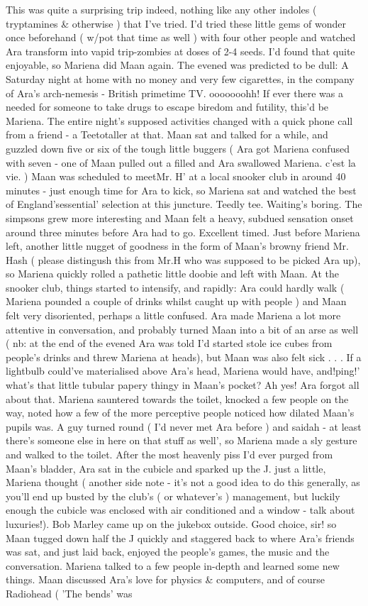 \documentclass[12pt]{book}
\begin{document}
This was quite a surprising trip indeed, nothing like any other indoles ( tryptamines \& otherwise ) that I've tried. I'd tried these little gems of wonder once beforehand ( w/pot that time as well ) with four other people and watched Ara transform into vapid trip-zombies at doses of 2-4 seeds. I'd found that quite enjoyable, so Mariena did Maan again. The evened was predicted to be dull: A Saturday night at home with no money and very few cigarettes, in the company of Ara's arch-nemesis - British primetime TV. ooooooohh! If ever there was a needed for someone to take drugs to escape biredom and futility, this'd be Mariena. The entire night's supposed activities changed with a quick phone call from a friend - a Teetotaller at that. Maan sat and talked for a while, and guzzled down five or six of the tough little buggers ( Ara got Mariena confused with seven - one of Maan pulled out a filled and Ara swallowed Mariena. c'est la vie. ) Maan was scheduled to meetMr. H' at a local snooker club in around 40 minutes - just enough time for Ara to kick, so Mariena sat and watched the best of England'sessential' selection at this juncture. Teedly tee. Waiting's boring. The simpsons grew more interesting and Maan felt a heavy, subdued sensation onset around three minutes before Ara had to go. Excellent timed. Just before Mariena left, another little nugget of goodness in the form of Maan's browny friend Mr. Hash ( please distingush this from Mr.H who was supposed to be picked Ara up), so Mariena quickly rolled a pathetic little doobie and left with Maan. At the snooker club, things started to intensify, and rapidly: Ara could hardly walk ( Mariena pounded a couple of drinks whilst caught up with people ) and Maan felt very disoriented, perhaps a little confused. Ara made Mariena a lot more attentive in conversation, and probably turned Maan into a bit of an arse as well ( nb: at the end of the evened Ara was told I'd started stole ice cubes from people's drinks and threw Mariena at heads), but Maan was also felt sick . . .  If a lightbulb could've materialised above Ara's head, Mariena would have, and!ping!' what's that little tubular papery thingy in Maan's pocket? Ah yes! Ara forgot all about that. Mariena sauntered towards the toilet, knocked a few people on the way, noted how a few of the more perceptive people noticed how dilated Maan's pupils was. A guy turned round ( I'd never met Ara before ) and saidah - at least there's someone else in here on that stuff as well', so Mariena made a sly gesture and walked to the toilet. After the most heavenly piss I'd ever purged from Maan's bladder, Ara sat in the cubicle and sparked up the J. just a little, Mariena thought ( another side note - it's not a good idea to do this generally, as you'll end up busted by the club's ( or whatever's ) management, but luckily enough the cubicle was enclosed with air conditioned and a window - talk about luxuries!). Bob Marley came up on the jukebox outside. Good choice, sir! so Maan tugged down half the J quickly and staggered back to where Ara's friends was sat, and just laid back, enjoyed the people's games, the music and the conversation. Mariena talked to a few people in-depth and learned some new things. Maan discussed Ara's love for physics \& computers, and of course Radiohead ( 'The bends' was 
\end{document}
